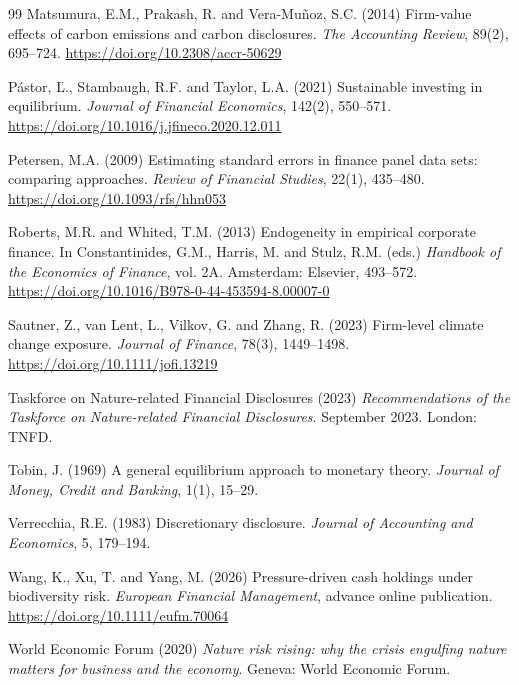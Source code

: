 \documentclass[12pt,a4paper]{article}
\begin{document}
\begin{thebibliography}{99}
 Matsumura, E.M., Prakash, R. and Vera-Mu\~noz, S.C. (2014) Firm-value effects of carbon emissions and carbon disclosures. \emph{The Accounting Review}, 89(2), 695--724. \url{https://doi.org/10.2308/accr-50629}

 P\'astor, \v{L}., Stambaugh, R.F. and Taylor, L.A. (2021) Sustainable investing in equilibrium. \emph{Journal of Financial Economics}, 142(2), 550--571. \url{https://doi.org/10.1016/j.jfineco.2020.12.011}

 Petersen, M.A. (2009) Estimating standard errors in finance panel data sets: comparing approaches. \emph{Review of Financial Studies}, 22(1), 435--480. \url{https://doi.org/10.1093/rfs/hhn053}

 Roberts, M.R. and Whited, T.M. (2013) Endogeneity in empirical corporate finance. In Constantinides, G.M., Harris, M. and Stulz, R.M. (eds.) \emph{Handbook of the Economics of Finance}, vol. 2A. Amsterdam: Elsevier, 493--572. \url{https://doi.org/10.1016/B978-0-44-453594-8.00007-0}

 Sautner, Z., van Lent, L., Vilkov, G. and Zhang, R. (2023) Firm-level climate change exposure. \emph{Journal of Finance}, 78(3), 1449--1498. \url{https://doi.org/10.1111/jofi.13219}

 Taskforce on Nature-related Financial Disclosures (2023) \emph{Recommendations of the Taskforce on Nature-related Financial Disclosures}. September 2023. London: TNFD.

 Tobin, J. (1969) A general equilibrium approach to monetary theory. \emph{Journal of Money, Credit and Banking}, 1(1), 15--29.

 Verrecchia, R.E. (1983) Discretionary disclosure. \emph{Journal of Accounting and Economics}, 5, 179--194.

 Wang, K., Xu, T. and Yang, M. (2026) Pressure-driven cash holdings under biodiversity risk. \emph{European Financial Management}, advance online publication. \url{https://doi.org/10.1111/eufm.70064}

 World Economic Forum (2020) \emph{Nature risk rising: why the crisis engulfing nature matters for business and the economy}. Geneva: World Economic Forum.

\end{thebibliography}
\end{document}
